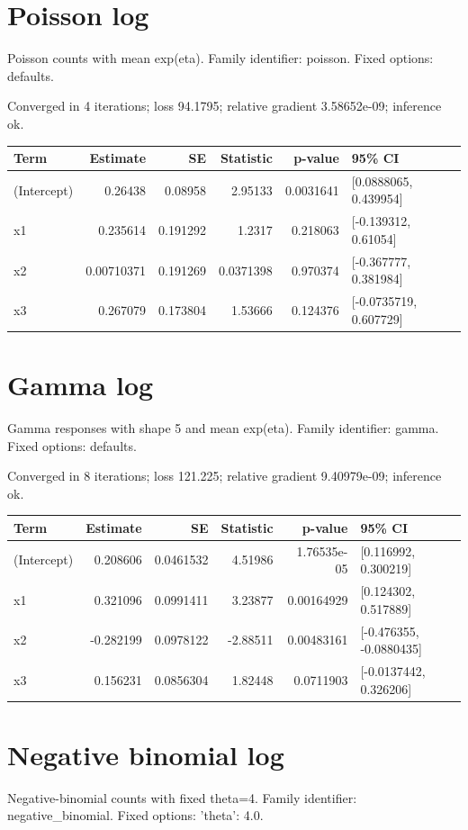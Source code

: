 \documentclass[11pt]{article}
\begin{document}
\section{Poisson log}
Poisson counts with mean exp(eta). Family identifier: poisson. Fixed options: defaults.

Converged in 4 iterations; loss 94.1795; relative gradient 3.58652e-09; inference ok.
\begin{center}\small\begin{tabular}{lrrrrl}\toprule
Term & Estimate & SE & Statistic & p-value & 95\% CI \\ \midrule
(Intercept) & 0.26438 & 0.08958 & 2.95133 & 0.0031641 & [0.0888065, 0.439954] \\
x1 & 0.235614 & 0.191292 & 1.2317 & 0.218063 & [-0.139312, 0.61054] \\
x2 & 0.00710371 & 0.191269 & 0.0371398 & 0.970374 & [-0.367777, 0.381984] \\
x3 & 0.267079 & 0.173804 & 1.53666 & 0.124376 & [-0.0735719, 0.607729] \\
\bottomrule\end{tabular}\end{center}
\section{Gamma log}
Gamma responses with shape 5 and mean exp(eta). Family identifier: gamma. Fixed options: defaults.

Converged in 8 iterations; loss 121.225; relative gradient 9.40979e-09; inference ok.
\begin{center}\small\begin{tabular}{lrrrrl}\toprule
Term & Estimate & SE & Statistic & p-value & 95\% CI \\ \midrule
(Intercept) & 0.208606 & 0.0461532 & 4.51986 & 1.76535e-05 & [0.116992, 0.300219] \\
x1 & 0.321096 & 0.0991411 & 3.23877 & 0.00164929 & [0.124302, 0.517889] \\
x2 & -0.282199 & 0.0978122 & -2.88511 & 0.00483161 & [-0.476355, -0.0880435] \\
x3 & 0.156231 & 0.0856304 & 1.82448 & 0.0711903 & [-0.0137442, 0.326206] \\
\bottomrule\end{tabular}\end{center}
\section{Negative binomial log}
Negative-binomial counts with fixed theta=4. Family identifier: negative\_binomial. Fixed options: {'theta': 4.0}.
\end{document}
